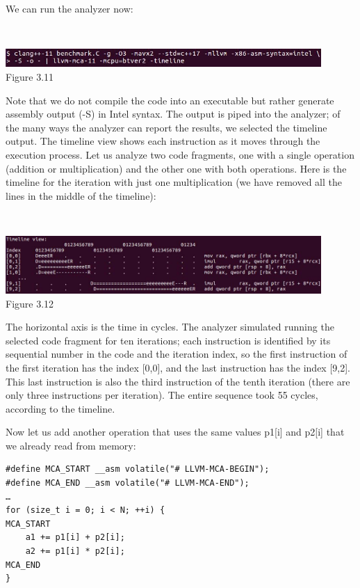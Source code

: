 We can run the analyzer now:

\hspace*{\fill} \\ %
\begin{center}
\includegraphics[width=0.9\textwidth]{content/1/chapter3/images/11.jpg}\\
Figure 3.11
\end{center}

Note that we do not compile the code into an executable but rather generate assembly output (-S) in Intel syntax. The output is piped into the analyzer; of the many ways the analyzer can report the results, we selected the timeline output. The timeline view shows each instruction as it moves through the execution process. Let us analyze two code fragments, one with a single operation (addition or multiplication) and the other one with both operations. Here is the timeline for the iteration with just one multiplication (we have removed all the lines in the middle of the timeline):

\hspace*{\fill} \\ %
\begin{center}
\includegraphics[width=0.9\textwidth]{content/1/chapter3/images/12.jpg}\\
Figure 3.12
\end{center}

The horizontal axis is the time in cycles. The analyzer simulated running the selected code fragment for ten iterations; each instruction is identified by its sequential number in the code and the iteration index, so the first instruction of the first iteration has the index [0,0], and the last instruction has the index [9,2]. This last instruction is also the third instruction of the tenth iteration (there are only three instructions per iteration). The entire sequence took 55 cycles, according to the timeline.

Now let us add another operation that uses the same values p1[i] and p2[i] that we already read from memory:

\begin{lstlisting}[style=styleCXX]
#define MCA_START __asm volatile("# LLVM-MCA-BEGIN");
#define MCA_END __asm volatile("# LLVM-MCA-END");
…
for (size_t i = 0; i < N; ++i) {
MCA_START
	a1 += p1[i] + p2[i];
	a2 += p1[i] * p2[i];
MCA_END
}
\end{lstlisting}


